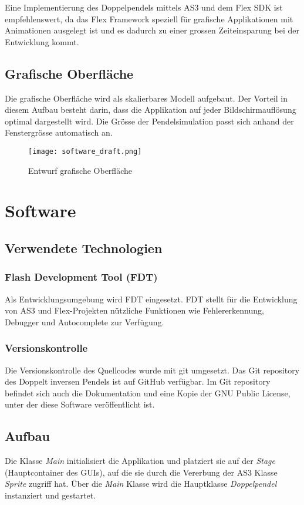 \documentclass[12pt]{article}
\numberwithin{equation}{subsection}
\begin{document}
Eine Implementierung des Doppelpendels mittels AS3 und dem Flex SDK ist empfehlenswert, da das Flex Framework speziell für grafische Applikationen mit Animationen ausgelegt ist und es dadurch zu einer grossen Zeiteinsparung bei der Entwicklung kommt.

\subsection{Grafische Oberfläche}
Die grafische Oberfläche wird als skalierbares Modell aufgebaut. Der Vorteil in diesem Aufbau besteht darin, dass die Applikation auf jeder Bildschirmauflösung optimal dargestellt wird. Die Grösse der Pendelsimulation passt sich anhand der Fenstergrösse automatisch an.

\begin{figure}[H]
	\centering
	\texttt{[image: software\_draft.png]}
	\caption{Entwurf grafische Oberfläche}
	\label{fig:gui:draft}
\end{figure}


\newpage
\section{Software}
\subsection{Verwendete Technologien}
\subsubsection{Flash Development Tool (FDT)}
Als Entwicklungsumgebung wird FDT \citep{fdt} eingesetzt. FDT stellt für die Entwicklung von AS3 und Flex-Projekten nützliche Funktionen wie Fehlererkennung, Debugger und Autocomplete zur Verfügung.

\subsubsection{Versionskontrolle}
Die Versionskontrolle des Quellcodes wurde mit git \citep{git} umgesetzt. Das Git repository des Doppelt inversen Pendels ist auf GitHub \citep{github} verfügbar. Im Git repository befindet sich auch die Dokumentation und eine Kopie der GNU Public License, unter der diese Software veröffentlicht ist.

\subsection{Aufbau}
Die Klasse \textit{Main} initialisiert die Applikation und platziert sie auf der \textit{Stage} (Hauptcontainer des GUIs), auf die sie durch die Vererbung der AS3 Klasse \textit{Sprite} zugriff hat. Über die \textit{Main} Klasse wird die Hauptklasse \textit{Doppelpendel} instanziert und gestartet. 
\end{document}
